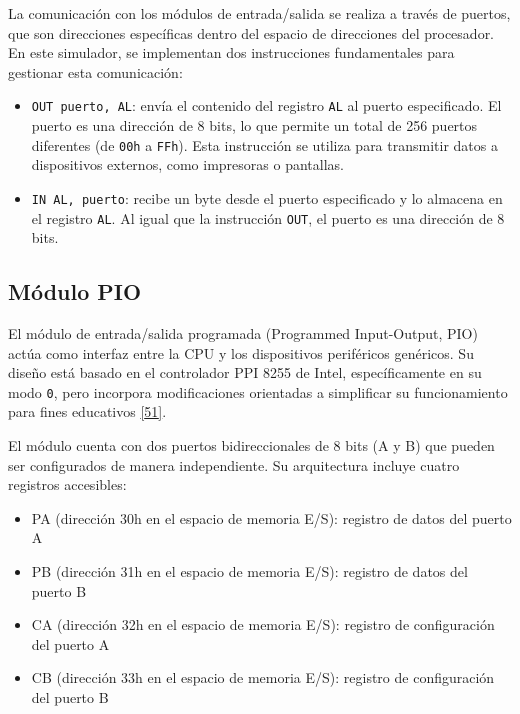 \documentclass[12pt,oneside]{templates/unerthesis}
\providecommand{\tightlist}{%
  \setlength{\itemsep}{0pt}\setlength{\parskip}{0pt}}
\begin{document}
La comunicación con los módulos de entrada/salida se realiza a través de puertos, que son direcciones específicas dentro del espacio de direcciones del procesador. En este simulador, se implementan dos instrucciones fundamentales para gestionar esta comunicación:

\begin{itemize}
\tightlist
\item
  \texttt{OUT\ puerto,\ AL}: envía el contenido del registro \texttt{AL} al puerto especificado. El puerto es una dirección de 8 bits, lo que permite un total de 256 puertos diferentes (de \texttt{00h} a \texttt{FFh}). Esta instrucción se utiliza para transmitir datos a dispositivos externos, como impresoras o pantallas.
\item
  \texttt{IN\ AL,\ puerto}: recibe un byte desde el puerto especificado y lo almacena en el registro \texttt{AL}. Al igual que la instrucción \texttt{OUT}, el puerto es una dirección de 8 bits.
\end{itemize}

\hypertarget{muxf3dulo-pio}{%
\subsection{Módulo PIO}\label{muxf3dulo-pio}}

El módulo de entrada/salida programada (Programmed Input-Output, PIO) actúa como interfaz entre la CPU y los dispositivos periféricos genéricos. Su diseño está basado en el controlador PPI 8255 de Intel, específicamente en su modo \texttt{0}, pero incorpora modificaciones orientadas a simplificar su funcionamiento para fines educativos \protect\hyperlink{ref-intel8086manual}{{[}51{]}}.

El módulo cuenta con dos puertos bidireccionales de 8 bits (A y B) que pueden ser configurados de manera independiente. Su arquitectura incluye cuatro registros accesibles:

\begin{itemize}
\tightlist
\item
  PA (dirección 30h en el espacio de memoria E/S): registro de datos del puerto A
\item
  PB (dirección 31h en el espacio de memoria E/S): registro de datos del puerto B
\item
  CA (dirección 32h en el espacio de memoria E/S): registro de configuración del puerto A
\item
  CB (dirección 33h en el espacio de memoria E/S): registro de configuración del puerto B
\end{itemize}
\end{document}
